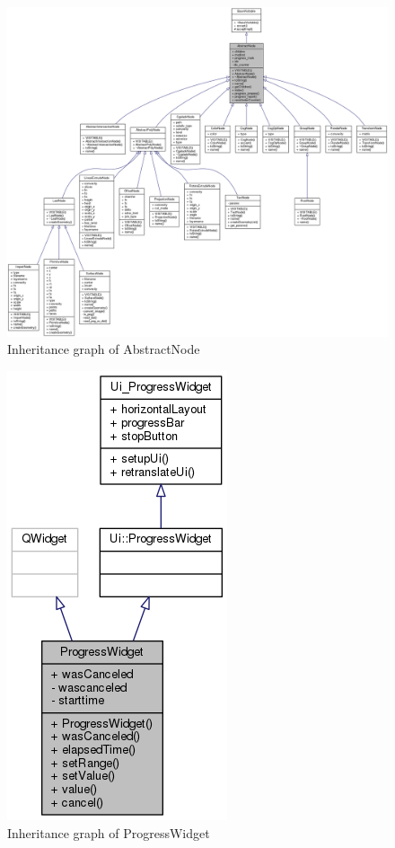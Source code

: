 \begin{figure}
\centering
\includegraphics[width=\linewidth,height=1.37\columnwidth]{images/classAbstractNode__inherit__graph}
\caption{Inheritance graph of AbstractNode}
\label{fig:classabstractnodeinheritgraph}
\end{figure}


\begin{figure}
\centering
\includegraphics[width=0.4\linewidth]{images/classProgressWidget__inherit__graph}
\caption{Inheritance graph of ProgressWidget}
\label{fig:classprogresswidgetinheritgraph}
\end{figure}


